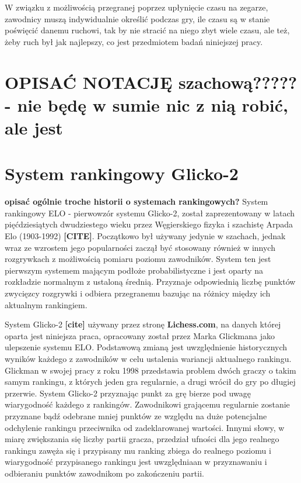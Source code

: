 \documentclass[inzynierska]{pwr_wmat_praca_dyplomowa}
\theoremstyle{plain}
\numberwithin{theorem}{chapter}
\theoremstyle{definition}
\numberwithin{theorem}{chapter}
\begin{document}
W związku z możliwością przegranej poprzez upłynięcie czasu na zegarze, zawodnicy muszą indywidualnie określić podczas gry, ile czasu są w stanie poświęcić danemu ruchowi, tak by nie stracić na niego zbyt wiele czasu, ale też, żeby ruch był jak najlepszy, co jest przedmiotem badań niniejszej pracy.

\section{OPISAĆ NOTACJĘ szachową????? - nie będę w sumie nic z nią robić, ale jest}

\section{System rankingowy Glicko-2}
\textbf{opisać ogólnie troche historii o systemach rankingowych?}
System rankingowy ELO - pierwowzór systemu Glicko-2, został zaprezentowany w latach pięćdziesiątych dwudziestego wieku przez Węgierskiego fizyka i szachistę Arpada Elo (1903-1992) \textbf{[CITE]}. Początkowo był używany jedynie w szachach, jednak wraz ze wzrostem jego popularności zaczął być stosowany również w innych rozgrywkach z możliwością pomiaru poziomu zawodników. System ten jest pierwszym systemem mającym podłoże probabilistyczne i jest oparty na rozkładzie normalnym z ustaloną średnią. Przyznaje odpowiednią liczbę punktów zwycięzcy rozgrywki i odbiera przegranemu bazując na różnicy między ich aktualnym rankingiem.


System Glicko-2 \textbf{[cite]} używany przez stronę \textbf{Lichess.com}, na danych której oparta jest niniejsza praca, opracowany został przez Marka Glickmana jako ulepszenie systemu ELO. Podstawową zmianą jest uwzględnienie historycznych wyników każdego z zawodników w celu ustalenia wariancji aktualnego rankingu. Glickman w swojej pracy z roku 1998 przedstawia problem dwóch graczy o takim samym rankingu, z których jeden gra regularnie, a drugi wrócił do gry po długiej przerwie. System Glicko-2 przyznając punkt za grę bierze pod uwagę wiarygodność każdego z rankingów. Zawodnikowi grającemu regularnie zostanie przyznane bądź odebrane mniej punktów ze względu na duże potencjalne odchylenie rankingu przeciwnika od zadeklarowanej wartości. Innymi słowy, w miarę zwiększania się liczby partii gracza, przedział ufności dla jego realnego rankingu zawęża się i przypisany mu ranking zbiega do realnego poziomu i wiarygodność przypisanego rankingu jest uwzględniaan w przyznawaniu i odbieraniu punktów zawodnikom po zakończeniu partii.
\end{document}

